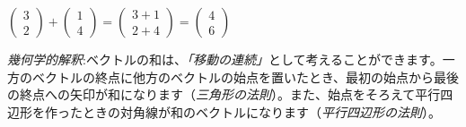 \begin{ex}
$\begin{pmatrix} 3 \\ 2 \end{pmatrix} + \begin{pmatrix} 1 \\ 4 \end{pmatrix} = \begin{pmatrix} 3 + 1 \\ 2 + 4 \end{pmatrix} = \begin{pmatrix} 4 \\ 6 \end{pmatrix}$
\end{ex}

\emph{幾何学的解釈}:ベクトルの和は、\emph{「移動の連続」}として考えることができます。一方のベクトルの終点に他方のベクトルの始点を置いたとき、最初の始点から最後の終点への矢印が和になります（\emph{三角形の法則}）。また、始点をそろえて平行四辺形を作ったときの対角線が和のベクトルになります（\emph{平行四辺形の法則}）。

